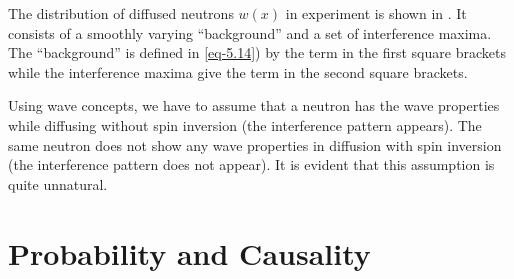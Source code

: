 The distribution of diffused neutrons $w(x)$ in experiment is shown in
. It consists of a smoothly varying ``background'' and a set of interference maxima. The ``background'' is defined in \eqref{eq-5.14}) by the term in the first square brackets while the interference maxima give the term in the second square brackets.

Using wave concepts, we have to assume that a neutron has the wave
properties while diffusing without spin inversion (the interference pattern
appears). The same neutron does not show any wave properties in
diffusion with spin inversion (the interference pattern does not appear).
It is evident that this assumption is quite unnatural.

\section{Probability and Causality }

